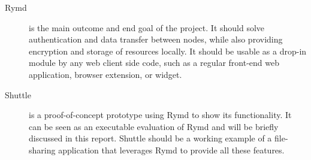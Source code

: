 \begin{description}
\item[Rymd] is the main outcome and end goal of the project. It should solve authentication and data transfer between nodes, while also providing encryption and storage of resources locally. It should be usable as a drop-in module by any web client side code, such as a regular front-end web application, browser extension, or widget.
\item[Shuttle] is a proof-of-concept prototype using Rymd to show its functionality. It can be seen as an executable evaluation of Rymd and will be briefly discussed in this report. Shuttle should be a working example of a file-sharing application that leverages Rymd to provide all these features.
\end{description}
